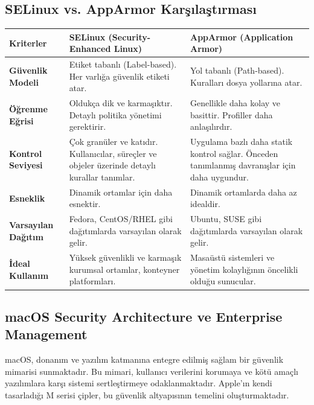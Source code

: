 \subsection{SELinux vs. AppArmor Karşılaştırması}

\begin{tabular}{|p{4cm}|p{6cm}|p{4cm}|}
\hline

\hline

\textbf{Kriterler} & \textbf{SELinux (Security-Enhanced Linux)} & \textbf{AppArmor (Application Armor)} \\
\hline
\hline
\textbf{Güvenlik Modeli} & Etiket tabanlı (Label-based). Her varlığa güvenlik etiketi atar. & Yol tabanlı (Path-based). Kuralları dosya yollarına atar. \\
\hline
\hline
\textbf{Öğrenme Eğrisi} & Oldukça dik ve karmaşıktır. Detaylı politika yönetimi gerektirir. & Genellikle daha kolay ve basittir. Profiller daha anlaşılırdır. \\
\hline
\hline
\textbf{Kontrol Seviyesi} & Çok granüler ve katıdır. Kullanıcılar, süreçler ve objeler üzerinde detaylı kurallar tanımlar. & Uygulama bazlı daha statik kontrol sağlar. Önceden tanımlanmış davranışlar için daha uygundur. \\
\hline
\hline
\textbf{Esneklik} & Dinamik ortamlar için daha esnektir. & Dinamik ortamlarda daha az idealdir. \\
\hline
\hline
\textbf{Varsayılan Dağıtım} & Fedora, CentOS/RHEL gibi dağıtımlarda varsayılan olarak gelir. & Ubuntu, SUSE gibi dağıtımlarda varsayılan olarak gelir. \\
\hline
\hline
\textbf{İdeal Kullanım} & Yüksek güvenlikli ve karmaşık kurumsal ortamlar, konteyner platformları. & Masaüstü sistemleri ve yönetim kolaylığının öncelikli olduğu sunucular. \\
\hline
\hline
\hline
\end{tabular}

\subsection{macOS Security Architecture ve Enterprise Management}

macOS, donanım ve yazılım katmanına entegre edilmiş sağlam bir güvenlik mimarisi sunmaktadır. Bu mimari, kullanıcı verilerini korumaya ve kötü amaçlı yazılımlara karşı sistemi sertleştirmeye odaklanmaktadır. Apple'ın kendi tasarladığı M serisi çipler, bu güvenlik altyapısının temelini oluşturmaktadır.

